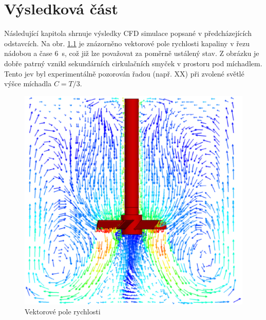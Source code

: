 \chapter{Výsledková část}
Následující kapitola shrnuje výsledky CFD simulace popsané v předcházejících odstavcích. Na obr. \ref{fig:vecfield} je znázorněno vektorové pole rychlosti kapaliny v řezu nádobou a čase \SI{6}{\second}, což již lze považovat za poměrně ustálený stav. Z obrázku je dobře patrný vznikl sekundárních cirkulačních smyček v prostoru pod míchadlem. Tento jev byl experimentálně pozorován řadou (např. XX) při zvolené světlé výšce míchadla $C=T/3$.  

\begin{figure}[h!]
\begin{center}
\includegraphics[scale=0.5]{images/vecfield.eps}
\caption{Vektorové pole rychlosti}
\label{fig:vecfield}
\end{center}
\end{figure} 


